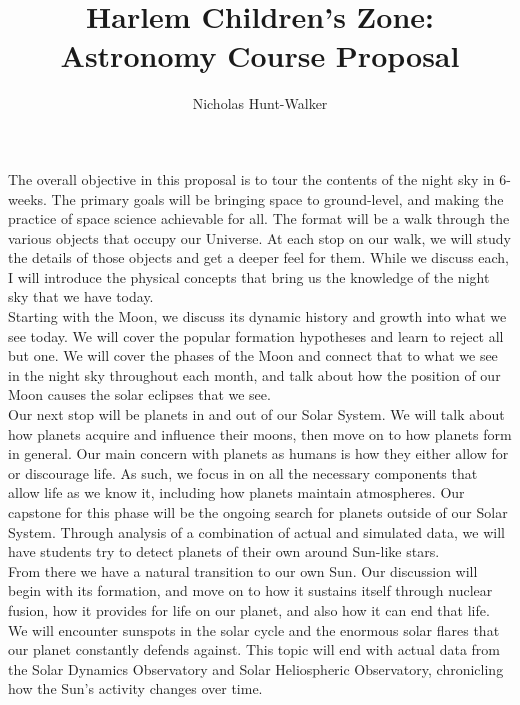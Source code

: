 \documentclass[12pt]{article}
\begin{document}
\title{Harlem Children's Zone: Astronomy Course Proposal}
\author{Nicholas Hunt-Walker}
\maketitle

The overall objective in this proposal is to tour the contents of the night sky in 6-weeks. The primary goals will be bringing space to ground-level, and making the practice of space science achievable for all. The format will be a walk through the various objects that occupy our Universe. At each stop on our walk, we will study the details of those objects and get a deeper feel for them. While we discuss each, I will introduce the physical concepts that bring us the knowledge of the night sky that we have today.\\

Starting with the Moon, we discuss its dynamic history and growth into what we see today. We will cover the popular formation hypotheses and learn to reject all but one.  We will cover the phases of the Moon and connect that to what we see in the night sky throughout each month, and talk about how the position of our Moon causes the solar eclipses that we see.\\

Our next stop will be planets in and out of our Solar System. We will talk about how planets acquire and influence their moons, then move on to how planets form in general. Our main concern with planets as humans is how they either allow for or discourage life. As such, we focus in on all the necessary components that allow life as we know it, including how planets maintain atmospheres. Our capstone for this phase will be the ongoing search for planets outside of our Solar System. Through analysis of a combination of actual and simulated data, we will have students try to detect planets of their own around Sun-like stars.\\

From there we have a natural transition to our own Sun. Our discussion will begin with its formation, and move on to how it sustains itself through nuclear fusion, how it provides for life on our planet, and also how it can end that life. We will encounter sunspots in the solar cycle and the enormous solar flares that our planet constantly defends against. This topic will end with actual data from the Solar Dynamics Observatory and Solar Heliospheric Observatory, chronicling how the Sun's activity changes over time.\\
\end{document}

